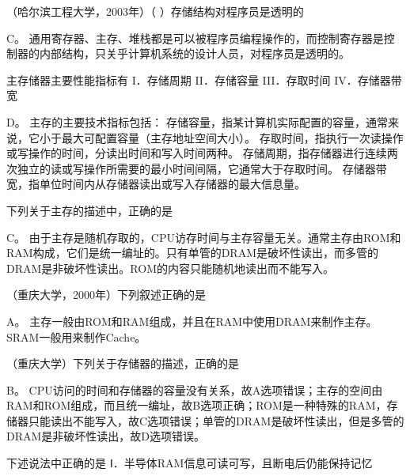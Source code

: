 \question （哈尔滨工程大学，2003年）（ ）存储结构对程序员是透明的
\par{}
\begin{solution}C。
通用寄存器、主存、堆栈都是可以被程序员编程操作的，而控制寄存器是控制器的内部结构，只关乎计算机系统的设计人员，对程序员是透明的。
\end{solution}
\question 主存储器主要性能指标有 I．存储周期 II．存储容量 III．存取时间
IV．存储器带宽
\par{}
\begin{solution}D。 主存的主要技术指标包括：
存储容量，指某计算机实际配置的容量，通常来说，它小于最大可配置容量（主存地址空间大小）。
存取时间，指执行一次读操作或写操作的时间，分读出时间和写入时间两种。
存储周期，指存储器进行连续两次独立的读或写操作所需要的最小时间间隔，它通常大于存取时间。
存储器带宽，指单位时间内从存储器读出或写入存储器的最大信息量。
\end{solution}
\question 下列关于主存的描述中，正确的是
\par{}
\begin{solution}C。
由于主存是随机存取的，CPU访存时间与主存容量无关。通常主存由ROM和RAM构成，它们是统一编址的。只有单管的DRAM是破坏性读出，而多管的DRAM是非破坏性读出。ROM的内容只能随机地读出而不能写入。
\end{solution}
\question （重庆大学，2000年）下列叙述正确的是
\par{}
\begin{solution}A。
主存一般由ROM和RAM组成，并且在RAM中使用DRAM来制作主存。SRAM一般用来制作Cache。
\end{solution}
\question （重庆大学）下列关于存储器的描述，正确的是
\par{}
\begin{solution}B。
CPU访问的时间和存储器的容量没有关系，故A选项错误；主存的空间由RAM和ROM组成，而且统一编址，故B选项正确；ROM是一种特殊的RAM，存储器只能读出不能写入，故C选项错误；单管的DRAM是破坏性读出，但是多管的DRAM是非破坏性读出，故D选项错误。
\end{solution}
\question 下述说法中正确的是 Ⅰ．半导体RAM信息可读可写，且断电后仍能保持记忆
